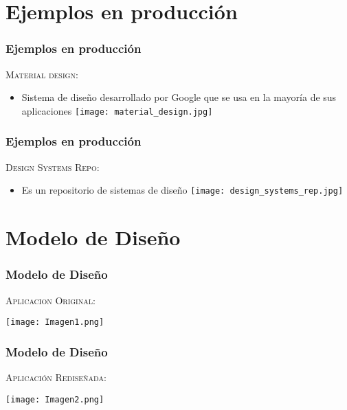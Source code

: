 \documentclass[11pt]{beamer}
\begin{document}
\section{Ejemplos en producción}
\begin{frame}
\frametitle{Ejemplos en producción}
\begin{itemize}
    \textsc{Material design: }
\end{itemize}
\begin{itemize}
    \item{Sistema de diseño desarrollado por Google que se usa en la mayoría de sus aplicaciones}
    {\texttt{[image: material\_design.jpg]}}
\end{itemize}
\end{frame}

\begin{frame}
\frametitle{Ejemplos en producción}
\begin{itemize}
    \textsc{Design Systems Repo: }\\
\end{itemize}
\begin{itemize}
    \item{Es un repositorio de sistemas de diseño}
    {\texttt{[image: design\_systems\_rep.jpg]}}
\end{itemize}
\end{frame}

\section{Modelo de Diseño}
\begin{frame}
\frametitle{Modelo de Diseño}
\begin{itemize}
    \textsc{Aplicacion Original: }
\end{itemize}
\begin{itemize}
\texttt{[image: Imagen1.png]}
\centering
\end{itemize}
\end{frame}

\begin{frame}
\frametitle{Modelo de Diseño}
\begin{itemize}
    \textsc{Aplicación Rediseñada: }
\end{itemize}
\begin{itemize}
\texttt{[image: Imagen2.png]}
\centering
\end{itemize}
\end{frame}
\end{document}
